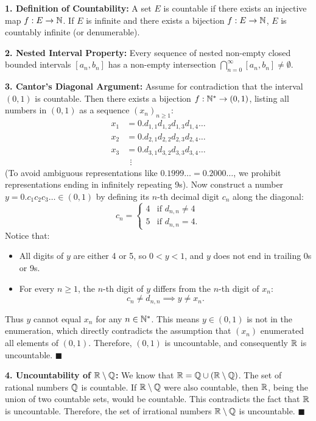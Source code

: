 \begin{solution}
\textbf{1. Definition of Countability:}
A set $E$ is countable if there exists an injective map $f: E \to \mathbb{N}$. If $E$ is infinite and there exists a bijection $f: E \to \mathbb{N}$, $E$ is countably infinite (or denumerable).

\textbf{2. Nested Interval Property:}
Every sequence of nested non-empty closed bounded intervals $[a_n, b_n]$ has a non-empty intersection $\bigcap_{n=0}^\infty [a_n, b_n] \ne \emptyset$.

\textbf{3. Cantor's Diagonal Argument:}
Assume for contradiction that the interval $(0, 1)$ is countable.
Then there exists a bijection $f: \mathbb{N}^* \to (0, 1)$, listing all numbers in $(0, 1)$ as a sequence $(x_n)_{n \ge 1}$:
\begin{align*}
x_1 &= 0.d_{1,1} d_{1,2} d_{1,3} d_{1,4} \dots \\
x_2 &= 0.d_{2,1} d_{2,2} d_{2,3} d_{2,4} \dots \\
x_3 &= 0.d_{3,1} d_{3,2} d_{3,3} d_{3,4} \dots \\
&\ \ \vdots
\end{align*}
(To avoid ambiguous representations like $0.1999\dots = 0.2000\dots$, we prohibit representations ending in infinitely repeating 9s).
Now construct a number $y = 0.c_1 c_2 c_3 \dots \in (0, 1)$ by defining its $n$-th decimal digit $c_n$ along the diagonal:
\[
c_n = \begin{cases}
4 & \text{if } d_{n,n} \ne 4 \\
5 & \text{if } d_{n,n} = 4.
\end{cases}
\]
Notice that:
\begin{itemize}[leftmargin=1.5em,itemsep=1pt]
  \item All digits of $y$ are either 4 or 5, so $0 < y < 1$, and $y$ does not end in trailing 0s or 9s.
  \item For every $n \ge 1$, the $n$-th digit of $y$ differs from the $n$-th digit of $x_n$:
  \[
  c_n \ne d_{n,n} \implies y \ne x_n.
  \]
\end{itemize}
Thus $y$ cannot equal $x_n$ for any $n \in \mathbb{N}^*$.
This means $y \in (0, 1)$ is not in the enumeration, which directly contradicts the assumption that $(x_n)$ enumerated all elements of $(0, 1)$.
Therefore, $(0, 1)$ is uncountable, and consequently $\mathbb{R}$ is uncountable. \hfill $\blacksquare$

\textbf{4. Uncountability of $\mathbb{R} \setminus \mathbb{Q}$:}
We know that $\mathbb{R} = \mathbb{Q} \cup (\mathbb{R} \setminus \mathbb{Q})$.
The set of rational numbers $\mathbb{Q}$ is countable.
If $\mathbb{R} \setminus \mathbb{Q}$ were also countable, then $\mathbb{R}$, being the union of two countable sets, would be countable.
This contradicts the fact that $\mathbb{R}$ is uncountable.
Therefore, the set of irrational numbers $\mathbb{R} \setminus \mathbb{Q}$ is uncountable. \hfill $\blacksquare$
\end{solution}
